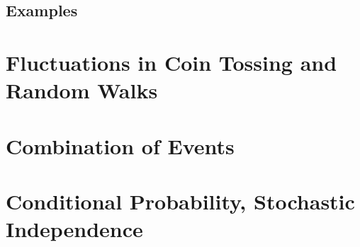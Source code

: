 \documentclass{article}
\numberwithin{equation}{subsection}
\begin{document}
		\subsection{Examples}
			
	\newpage
	\section{Fluctuations in Coin Tossing and Random Walks}
			
	\newpage
	\section{Combination of Events}
					
	\newpage
	\section{Conditional Probability, Stochastic Independence}
			
		
\end{document}
